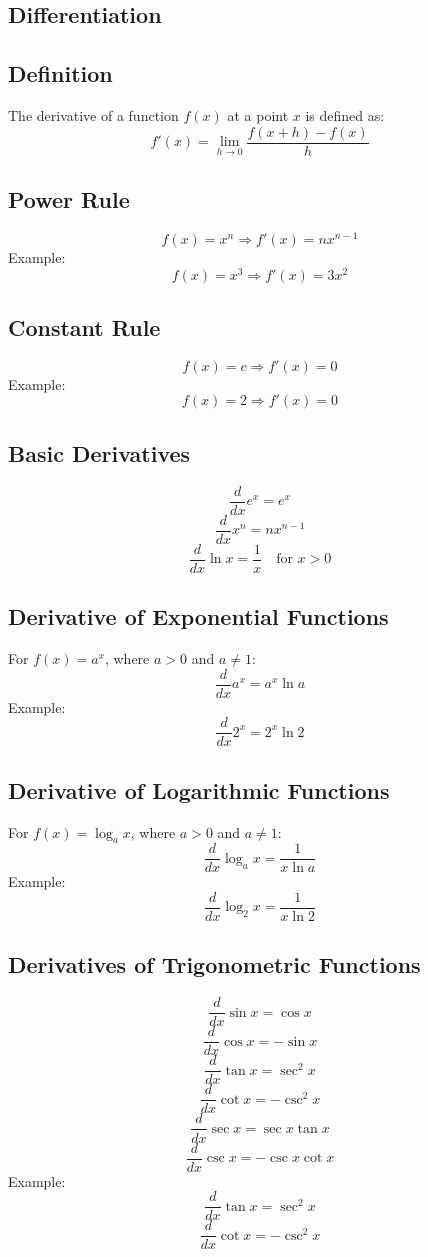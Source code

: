 \documentclass{article}
\begin{document}
\begin{multicols}{2}

\section*{Differentiation}

\subsection*{Definition}

The derivative of a function \( f(x) \) at a point \( x \) is defined as:
\[
f'(x) = \lim_{h \to 0} \frac{f(x+h) - f(x)}{h}
\]

\subsection*{Power Rule}
\[
f(x) = x^n \Rightarrow f'(x) = nx^{n-1}
\]
Example:
\[
f(x) = x^3 \Rightarrow f'(x) = 3x^2
\]

\subsection*{Constant Rule}
\[
f(x) = c \Rightarrow f'(x) = 0
\]
Example:
\[
f(x) = 2 \Rightarrow f'(x) = 0
\]

\subsection*{Basic Derivatives}
\[
\frac{d}{dx} e^x = e^x
\]
\[
\frac{d}{dx} x^n = n x^{n-1}
\]
\[
\frac{d}{dx} \ln x = \frac{1}{x} \quad \text{for } x > 0
\]

\subsection*{Derivative of Exponential Functions}
For \( f(x) = a^x \), where \( a > 0 \) and \( a \neq 1 \):
\[
\frac{d}{dx} a^x = a^x \ln a
\]
Example:
\[
\frac{d}{dx} 2^x = 2^x \ln 2
\]

\subsection*{Derivative of Logarithmic Functions}
For \( f(x) = \log_a x \), where \( a > 0 \) and \( a \neq 1 \):
\[
\frac{d}{dx} \log_a x = \frac{1}{x \ln a}
\]
Example:
\[
\frac{d}{dx} \log_2 x = \frac{1}{x \ln 2}
\]

\subsection*{Derivatives of Trigonometric Functions}
\[
\frac{d}{dx} \sin x = \cos x
\]
\[
\frac{d}{dx} \cos x = -\sin x
\]
\[
\frac{d}{dx} \tan x = \sec^2 x
\]
\[
\frac{d}{dx} \cot x = -\csc^2 x
\]
\[
\frac{d}{dx} \sec x = \sec x \tan x
\]
\[
\frac{d}{dx} \csc x = -\csc x \cot x
\]
Example:
\[
\frac{d}{dx} \tan x = \sec^2 x
\]
\[
\frac{d}{dx} \cot x = -\csc^2 x
\]


\end{multicols}
\end{document}

